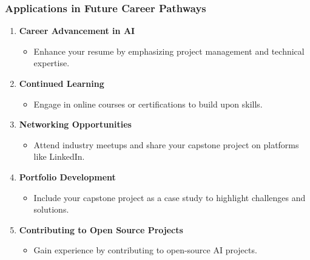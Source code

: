 \documentclass[aspectratio=169]{beamer}
\begin{document}
\begin{frame}[fragile]
  \frametitle{Applications in Future Career Pathways}
  \begin{enumerate}
    \item \textbf{Career Advancement in AI}
      \begin{itemize}
        \item Enhance your resume by emphasizing project management and technical expertise.
      \end{itemize}
    \item \textbf{Continued Learning}
      \begin{itemize}
        \item Engage in online courses or certifications to build upon skills.
      \end{itemize}
    \item \textbf{Networking Opportunities}
      \begin{itemize}
        \item Attend industry meetups and share your capstone project on platforms like LinkedIn.
      \end{itemize}
    \item \textbf{Portfolio Development}
      \begin{itemize}
        \item Include your capstone project as a case study to highlight challenges and solutions.
      \end{itemize}
    \item \textbf{Contributing to Open Source Projects}
      \begin{itemize}
        \item Gain experience by contributing to open-source AI projects.
      \end{itemize}
  \end{enumerate}
\end{frame}
\end{document}
